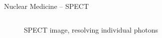 \begin{frame}[c]{Nuclear Medicine -- SPECT}
\begin{columns}[c, onlytextwidth]
\begin{column}{0.5\textwidth}
\begin{figure}
				\caption{\normalsize SPECT image, resolving individual photons}
			\end{figure}
		\end{column}%
	\end{columns}



\end{frame}
